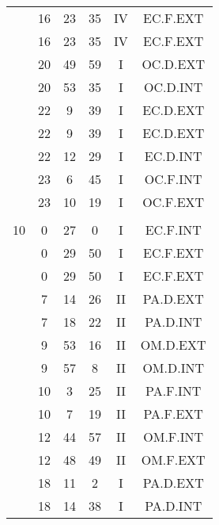 \documentclass[12pt, a4paper]{article}
\begin{document}
\begin{multicols}{3}
{\begin{tabular}{c c c c c c}
	 	 	 	 & 16 & 23 & 35 & IV & EC.F.EXT\\%
	 	 	 	 & 16 & 23 & 35 & IV & EC.F.EXT\\%
	 	 	 	 & 20 & 49 & 59 & I & OC.D.EXT\\%
	 	 	 	 & 20 & 53 & 35 & I & OC.D.INT\\%
	 	 	 	 & 22 & 9 & 39 & I & EC.D.EXT\\%
	 	 	 	 & 22 & 9 & 39 & I & EC.D.EXT\\%
	 	 	 	 & 22 & 12 & 29 & I & EC.D.INT\\%
	 	 	 	 & 23 & 6 & 45 & I & OC.F.INT\\%
	 	 	 	 & 23 & 10 & 19 & I & OC.F.EXT\\%
	 	 	 	 & & & & & \\%
	 	 	 	10 & 0 & 27 & 0 & I & EC.F.INT\\%
	 	 	 	 & 0 & 29 & 50 & I & EC.F.EXT\\%
	 	 	 	 & 0 & 29 & 50 & I & EC.F.EXT\\%
	 	 	 	 & 7 & 14 & 26 & II & PA.D.EXT\\%
	 	 	 	 & 7 & 18 & 22 & II & PA.D.INT\\%
	 	 	 	 & 9 & 53 & 16 & II & OM.D.EXT\\%
	 	 	 	 & 9 & 57 & 8 & II & OM.D.INT\\%
	 	 	 	 & 10 & 3 & 25 & II & PA.F.INT\\%
	 	 	 	 & 10 & 7 & 19 & II & PA.F.EXT\\%
	 	 	 	 & 12 & 44 & 57 & II & OM.F.INT\\%
	 	 	 	 & 12 & 48 & 49 & II & OM.F.EXT\\%
	 	 	 	 & 18 & 11 & 2 & I & PA.D.EXT\\%
	 	 	 	 & 18 & 14 & 38 & I & PA.D.INT\\%

\end{tabular}}
\end{multicols}
\end{document}
